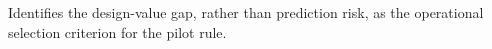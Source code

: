 Identifies the design-value gap, rather than prediction risk, as the operational selection criterion for the pilot rule.